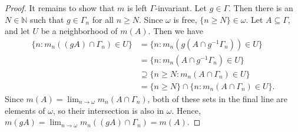 \documentclass[a4paper,10pt]{report}
\newcommand{\N}{\mathbb{N}}
\begin{document}
\begin{enumerate}
\begin{enumerate}
\begin{proof}
					It remains to show that $m$ is left $\Gamma$-invariant.
					Let $g \in \Gamma$.
					Then there is an $N \in \N$ such that $g \in \Gamma_n$ for all $n \ge N$.
					Since $\omega$ is free, $\{n \ge N\} \in \omega$.
					Let $A \subseteq \Gamma$, and let $U$ be a neighborhood of $m(A)$.
					Then we have
					\begin{align*}
						\{n : m_n((gA) \cap \Gamma_n) \in U\}
						 & = \{n : m_n(g(A \cap g^{-1}\Gamma_n)) \in U\} \\
						 & = \{n : m_n(A \cap g^{-1}\Gamma_n) \in U\} \\
						 & \supseteq \{n \ge N : m_n(A \cap \Gamma_n) \in U\} \\
						 & = \{n \ge N\} \cap \{n : m_n(A \cap \Gamma_n) \in U\}.
					\end{align*}
					Since $m(A) = \lim_{n \to \omega}{m_n(A \cap \Gamma_n)}$,
					both of these sets in the final line are elements of $\omega$,
					so their intersection is also in $\omega$.
					Hence, $m(gA) = \lim_{n \to \omega}{m_n((gA) \cap \Gamma_n)} = m(A)$.
				\end{proof}
		\end{enumerate}
\end{enumerate}
\end{document}
